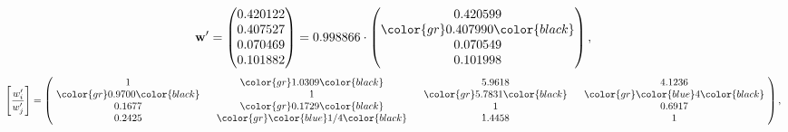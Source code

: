 \begin{example}
\begin{equation*}
\mathbf{w}^{\prime} =
\begin{pmatrix}
0.420122\\
0.407527\\
0.070469\\
0.101882
\end{pmatrix} =
0.998866\cdot
\begin{pmatrix}
0.420599\\
\color{gr} 0.407990\color{black} \\
0.070549\\
0.101998
\end{pmatrix},
\end{equation*}
\begin{equation*}
\left[ \frac{{w}^{\prime}_i}{{w}^{\prime}_j} \right] =
\begin{pmatrix}
$\,\,$ 1 $\,\,$ & $\,\,$\color{gr} 1.0309\color{black} $\,\,$ & $\,\,$5.9618$\,\,$ & $\,\,$4.1236$\,\,$ \\
$\,\,$\color{gr} 0.9700\color{black} $\,\,$ & $\,\,$ 1 $\,\,$ & $\,\,$\color{gr} 5.7831\color{black} $\,\,$ & $\,\,$\color{gr} \color{blue} 4\color{black}   $\,\,$ \\
$\,\,$0.1677$\,\,$ & $\,\,$\color{gr} 0.1729\color{black} $\,\,$ & $\,\,$ 1 $\,\,$ & $\,\,$0.6917 $\,\,$ \\
$\,\,$0.2425$\,\,$ & $\,\,$\color{gr} \color{blue}  1/4\color{black} $\,\,$ & $\,\,$1.4458$\,\,$ & $\,\,$ 1  $\,\,$ \\
\end{pmatrix},
\end{equation*}
\end{example}
\newpage
